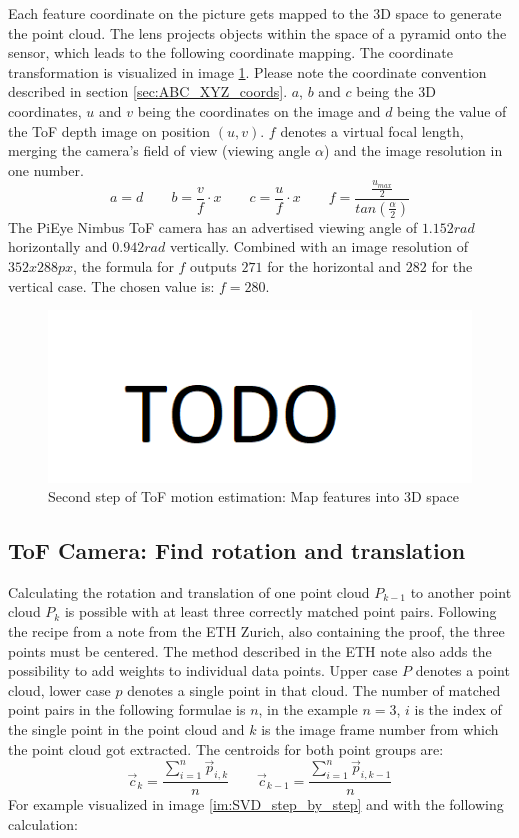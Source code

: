 Each feature coordinate on the picture gets mapped to the 3D space to generate the point cloud. The lens projects objects within the space of a pyramid onto the sensor, which leads to the following coordinate mapping. The coordinate transformation is visualized in image \ref{im:SiftCoordTransform}. Please note the coordinate convention described in section \ref{sec:ABC_XYZ_coords}. $a$, $b$ and $c$ being the 3D coordinates, $u$ and $v$ being the coordinates on the image and $d$ being the value of the ToF depth image on position $(u,v)$. $f$ denotes a virtual focal length, merging the camera's field of view (viewing angle $\alpha$) and the image resolution in one number.
\begin{equation*}
    a = d \qquad b = \frac{v}{f}\cdot x \qquad c = \frac{u}{f}\cdot x \qquad f=\frac{\tfrac{u_{max}}{2}}{tan(\tfrac{\alpha}{2})}
\end{equation*}
The PiEye Nimbus ToF camera has an advertised viewing angle of $1.152rad$ horizontally and $0.942rad$ vertically. Combined with an image resolution of $352 x 288px$, the formula for $f$ outputs $271$ for the horizontal and $282$ for the vertical case. The chosen value is: $f = 280$.
\begin{figure}[H]
    \centering
    \includegraphics[width=1.0\textwidth]{images/todo.png}
    \caption{Second step of ToF motion estimation: Map features into 3D space}
    \label{im:SiftCoordTransform}
\end{figure}
\subsection{ToF Camera: Find rotation and translation}
\label{sec:ToFPosition_SVD}
Calculating the rotation and translation of one point cloud $P_{k-1}$ to another point cloud $P_{k}$ is possible with at least three correctly matched point pairs. Following the recipe from a note from the ETH Zurich, also containing the proof, the three points must be centered. The method described in the ETH note also adds the possibility to add weights to individual data points. Upper case $P$ denotes a point cloud, lower case $p$ denotes a single point in that cloud. The number of matched point pairs in the following formulae is $n$, in the example $n = 3$, $i$ is the index of the single point in the point cloud and $k$ is the image frame number from which the point cloud got extracted.
The centroids for both point groups are:
\begin{equation*}
    \vec{c}_{k}=\frac{\sum_{i=1}^n \vec{p}_{i,k}}{n} \qquad 
    \vec{c}_{k-1}=\frac{\sum_{i=1}^n \vec{p}_{i,k-1}}{n}
\end{equation*}
For example visualized in image \ref{im:SVD_step_by_step} and with the following calculation:


